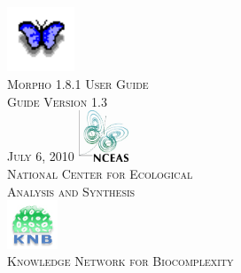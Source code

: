 \documentclass[11pt]{article}
\begin{document}
  \pagestyle{empty}

  \begin{titlepage}
    \begin{center}
    \includegraphics[width=2cm]{images/logo-morpho.png}\\[0.5cm]
    \textsc{\LARGE Morpho 1.8.1 User Guide}\\[1cm]
    \textsc{Guide Version 1.3}\\
    \textsc{July 6, 2010}
    \vfill
    \includegraphics[width=1.5cm]{images/logo-nceas.jpg}\\[0.5cm]
    \textsc{National Center for Ecological\\Analysis and Synthesis}\\[1cm]
    \includegraphics[width=1.5cm]{images/logo-knb.jpg}\\[0.2cm]
    \textsc{Knowledge Network for Biocomplexity}
    \end{center}
  \end{titlepage}
  \pagebreak

  \tableofcontents
  \pagebreak

  
    \setcounter{figure}{0} 
  
    \setcounter{figure}{0} 
  
    \setcounter{figure}{0} 
  
    \setcounter{figure}{0} 
  
    \setcounter{figure}{0} 
  
    \setcounter{figure}{0} 
  
    \setcounter{figure}{0} 
  
    \setcounter{figure}{0} 
  
    \setcounter{figure}{0} 
  
    \setcounter{figure}{0} 
  
    \setcounter{figure}{0} 
  
    \setcounter{figure}{0} 
  

\end{document}
